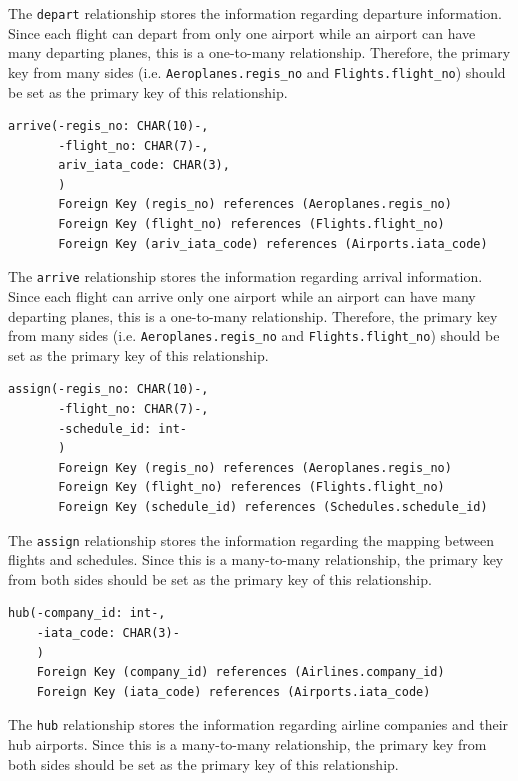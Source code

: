 \documentclass{article}
\begin{document}
	The \texttt{depart} relationship stores the information regarding departure information. Since each flight can depart from only one airport while an airport can have many departing planes, this is a one-to-many relationship. Therefore, the primary key from many sides (i.e. \texttt{Aeroplanes.regis\_no} and \texttt{Flights.flight\_no}) should be set as the primary key of this relationship.

	\begin{lstlisting}[keepspaces=true]
arrive(-regis_no: CHAR(10)-,
       -flight_no: CHAR(7)-, 
       ariv_iata_code: CHAR(3),
       )  
       Foreign Key (regis_no) references (Aeroplanes.regis_no)
       Foreign Key (flight_no) references (Flights.flight_no)
       Foreign Key (ariv_iata_code) references (Airports.iata_code)
	\end{lstlisting}    

	The \texttt{arrive} relationship stores the information regarding arrival information. Since each flight can arrive only one airport while an airport can have many departing planes, this is a one-to-many relationship. Therefore, the primary key from many sides (i.e. \texttt{Aeroplanes.regis\_no} and \texttt{Flights.flight\_no}) should be set as the primary key of this relationship.

	\begin{lstlisting}[keepspaces=true]		
assign(-regis_no: CHAR(10)-,
       -flight_no: CHAR(7)-,
       -schedule_id: int-
       )
       Foreign Key (regis_no) references (Aeroplanes.regis_no)
       Foreign Key (flight_no) references (Flights.flight_no)
       Foreign Key (schedule_id) references (Schedules.schedule_id)
	\end{lstlisting}    

	The \texttt{assign} relationship stores the information regarding the mapping between flights and schedules. Since this is a many-to-many relationship, the primary key from both sides should be set as the primary key of this relationship.

	\begin{lstlisting}[keepspaces=true]	
hub(-company_id: int-,
    -iata_code: CHAR(3)-
    )
    Foreign Key (company_id) references (Airlines.company_id)
    Foreign Key (iata_code) references (Airports.iata_code)
	\end{lstlisting}    

	The \texttt{hub} relationship stores the information regarding airline companies and their hub airports. Since this is a many-to-many relationship, the primary key from both sides should be set as the primary key of this relationship.
\end{document}
